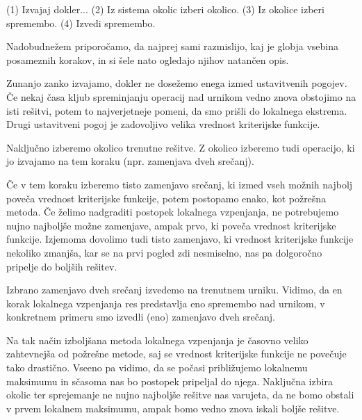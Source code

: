 \documentclass[a4paper,10pt]{article}
\begin{document}
(1) Izvajaj dokler...
{
   (2) Iz sistema okolic izberi okolico.
   (3) Iz okolice izberi spremembo.
   (4) Izvedi spremembo.
}

Nadobudnežem priporočamo, da najprej sami razmislijo, kaj je globja vsebina posameznih
korakov, in si šele nato ogledajo njihov natančen opis.

   Zunanjo zanko izvajamo, dokler ne dosežemo enega izmed ustavitvenih pogojev.
   Če nekaj časa kljub spreminjanju operacij nad urnikom vedno znova obstojimo na isti
   rešitvi, potem to najverjetneje pomeni, da smo prišli do lokalnega ekstrema. Drugi
   ustavitveni pogoj je zadovoljivo velika vrednost kriterijske funkcije.

   Naključno izberemo okolico trenutne rešitve. Z okolico izberemo tudi operacijo,
   ki jo izvajamo na tem koraku (npr. zamenjava dveh srečanj).

   Če v tem koraku izberemo tisto zamenjavo srečanj, ki izmed vseh možnih najbolj
   poveča vrednost kriterijske funkcije, potem postopamo enako, kot požrešna metoda. Če
   želimo nadgraditi postopek lokalnega vzpenjanja, ne potrebujemo nujno najboljše možne
   zamenjave, ampak prvo, ki poveča vrednost kriterijske funkcije. Izjemoma dovolimo tudi
   tisto zamenjavo, ki vrednost kriterijske funkcije nekoliko zmanjša, kar se na prvi
   pogled zdi nesmiselno, nas pa dolgoročno pripelje do boljših rešitev.

   Izbrano zamenjavo dveh srečanj izvedemo na trenutnem urniku. Vidimo, da en korak
   lokalnega vzpenjanja res predstavlja eno spremembo nad urnikom, v konkretnem primeru
   smo izvedli (eno) zamenjavo dveh srečanj.

Na tak način izboljšana metoda lokalnega vzpenjanja je časovno veliko zahtevnejša od
požrešne metode, saj se vrednost kriterijske funkcije ne povečuje tako drastično. Vseeno
pa vidimo, da se počasi približujemo lokalnemu maksimumu in sčasoma nas bo postopek
pripeljal do njega. Naključna izbira okolic ter sprejemanje ne nujno najboljše rešitve
nas varujeta, da ne bomo obstali v prvem lokalnem maksimumu, ampak bomo vedno znova
iskali boljše rešitve.
\end{document}

